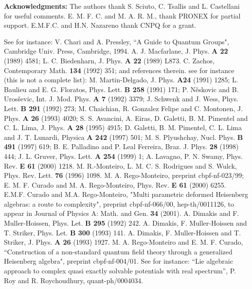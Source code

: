 \documentclass[a4paper,12pt]{article}
\begin{document}
\vspace{0.7 cm}
\noindent
{\bf Acknowledgments:} The authors thank S. Sciuto, C. Tsallis and
L. Castellani for useful comments. E. M. F. C. and 
M. A. R. M., thank PRONEX for partial support. E.M.F.C. and H.N. Nazareno 
thank CNPQ for a grant.




\vspace{0.7 cm} 


\begin{thebibliography}{20}
 See for instance: V. Chari and A. Pressley, 
``A Guide to Quantum Groups", Cambridge Univ. Press, 
Cambridge, 1994.
 A. J. Macfarlane, J. Phys. {\bf A 22} (1989) 4581;
L. C. Biedenharn, J. Phys. {\bf A 22} (1989) L873.
 C. Zachos, Contemporary Math. {\bf 134} (1992) 351;
and references therein.
 see for instance (this is not a complete list): 
M. Martin-Delgado, J. Phys. {\bf A24}
(1991) 1285; L. Baulieu and E. G. Floratos, Phys. Lett. {\bf B 258}
(1991) 171; P. N\v{e}skovic and B. Uros\v{s}evic, Int. J. Mod. Phys. 
{\bf A 7} (1992) 3379; J. Schwenk and J. Wess, Phys. Lett. {\bf B 291}
(1992) 273; M. Chaichian, R. Gonzalez Felipe and C. Montonen,
J. Phys. {\bf A 26} (1993) 4020; S. S. Avancini, A. Eiras, D. Galetti,
B. M. Pimentel and C. L. Lima, J. Phys. {\bf A 28} (1995) 4915;
D. Galetti, B. M. Pimentel, C. L. Lima and J. T. Lunardi, Physica {\bf A 242}
(1997) 501; M. S. Plyushchay, Nucl. Phys.
{\bf B 491} (1997) 619; B. E. Palladino and P. Leal Ferreira, Braz. J.
Phys. {\bf 28} (1998) 444; J. L. Gruver, Phys. Lett. {\bf A 254} (1999) 1;
A. Lavagno, P. N. Swamy, Phys. Rev. {\bf E 61} (2000) 1218.
 M. R.-Monteiro, L. M. C. S. Rodrigues and S. Wulck,
Phys. Rev. Lett. {\bf 76} (1996) 1098. 
 M. A. Rego-Monteiro, preprint cbpf-nf-023/99; 
E. M. F. Curado and M. A. Rego-Monteiro, Phys. Rev. {\bf E 61} (2000) 6255.
 E.M.F. Curado and M.A. Rego-Monteiro,
"Multi parametric deformed Heisenberg algebras: a route to
complexity", preprint cbpf-nf-066/00, hep-th/0011126, to
appear in Journal of Physics A: Math. and
Gen. {\bf 34} (2001).
 A. Dimakis and F. Muller-Hoissen, Phys. Let.  
{\bf B 295} (1992) 242.
 A. Dimakis, F. Muller-Hoissen and T. Striker, 
Phys. Let.  {\bf B 300} (1993) 141.
 A. Dimakis, F. Muller-Hoissen and T. Striker,
J. Phys. {\bf A 26} (1993) 1927.
 M. A. Rego-Monteiro and E. M. F. Curado, ``Construction 
of a non-standard quantum field theory through a generalized Heisenberg 
algebra", preprint cbpf-nf-004/01.
 See for instance: ``Lie algebraic approach to complex
quasi exactly solvable potentials with real spectrum'', P. Roy and R. 
Roychoudhury, quant-ph/0004034. 
\end{thebibliography}
\end{document}
